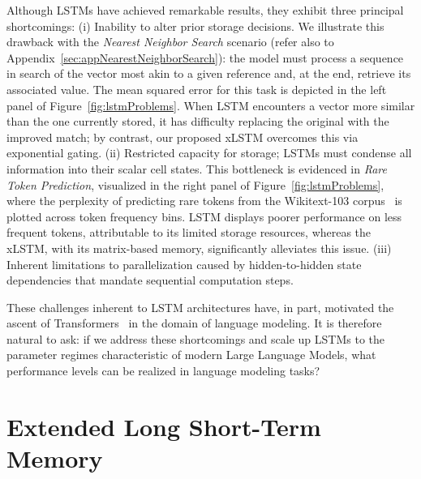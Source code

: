 Although LSTMs have achieved remarkable results, they exhibit three principal shortcomings: (i) Inability to alter prior storage decisions. We illustrate this drawback with the {\it Nearest Neighbor Search} scenario (refer also to Appendix~\ref{sec:appNearestNeighborSearch}): the model must process a sequence in search of the vector most akin to a given reference and, at the end, retrieve its associated value. The mean squared error for this task is depicted in the left panel of Figure~\ref{fig:lstmProblems}. When LSTM encounters a vector more similar than the one currently stored, it has difficulty replacing the original with the improved match; by contrast, our proposed xLSTM overcomes this via exponential gating. (ii) Restricted capacity for storage; LSTMs must condense all information into their scalar cell states. This bottleneck is evidenced in {\it Rare Token Prediction}, visualized in the right panel of Figure~\ref{fig:lstmProblems}, where the perplexity of predicting rare tokens from the Wikitext-103 corpus~\citep{Merity:17} is plotted across token frequency bins. LSTM displays poorer performance on less frequent tokens, attributable to its limited storage resources, whereas the xLSTM, with its matrix-based memory, significantly alleviates this issue. (iii) Inherent limitations to parallelization caused by hidden-to-hidden state dependencies that mandate sequential computation steps.

These challenges inherent to LSTM architectures have, in part, motivated the ascent of Transformers~\citep{Vaswani:17} in the domain of language modeling. It is therefore natural to ask: if we address these shortcomings and scale up LSTMs to the parameter regimes characteristic of modern Large Language Models, what performance levels can be realized in language modeling tasks?

\section{Extended Long Short-Term Memory}
\label{sec:xLSTM}

